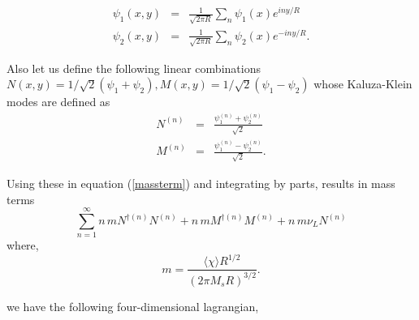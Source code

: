 \documentclass[a4paper,12pt]{article}
\begin{document}
\begin{eqnarray}
\psi_1(x,y)&=&\frac{1}{\sqrt{2\pi R}}\sum_{n}\psi_1(x)e^{iny/R} \\
\psi_2(x,y)&=&\frac{1}{\sqrt{2\pi R}}\sum_{n}\psi_2(x)e^{-iny/R}.
\end{eqnarray}

Also let us define the following linear combinations
$N(x,y)=1/\sqrt{2}(\psi_1+\psi_2),M(x,y)=1/\sqrt{2}(\psi_1-\psi_2)$
whose Kaluza-Klein modes are defined as
\begin{eqnarray}
N^{(n)}&=&\frac{\psi_1^{(n)}+\psi_2^{(n)}}{\sqrt{2}} \\
M^{(n)}&=&\frac{\psi_1^{(n)}-\psi_2^{(n)}}{\sqrt{2}}.
\end{eqnarray}

Using these in equation (\ref{massterm}) and integrating by parts,
results in mass terms
\begin{equation}
\sum_{n=1}^{\infty}n\,m N^{\dagger(n)}N^{(n)}+n\,m
M^{\dagger(n)}M^{(n)}+n\,m\nu_L N^{(n)}
\end{equation}
where,
\begin{equation}
m=\frac{\langle\chi\rangle R^{1/2}}{(2\pi M_s R)^{3/2}}.
\end{equation}


we have the following four-dimensional lagrangian,
\end{document}
